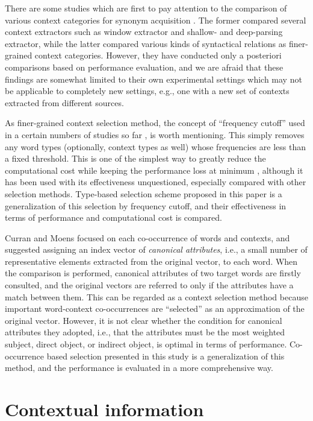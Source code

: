 \documentclass[english]{jnlp_1.4}
\begin{document}
There are some studies which are first to pay attention to the
comparison of various context categories for synonym acquisition
\cite{Curran:02:scaling,Hagiwara:06}. The former compared several
context extractors such as window extractor and shallow- and
deep-parsing extractor, while the latter compared various kinds of
syntactical relations as finer-grained context categories.  However,
they have conducted only a posteriori comparisons based on performance
evaluation, and we are afraid that these findings are somewhat limited
to their own experimental settings which may not be applicable to
completely new settings, e.g., one with a new set of contexts
extracted from different sources.

As finer-grained context selection method, the concept of ``frequency
cutoff'' used in a certain numbers of studies so far
\cite{Curran:02:scaling,Pado:07}, is worth mentioning. This simply
removes any word types (optionally, context types as well) whose
frequencies are less than a fixed threshold. This is one of the
simplest way to greatly reduce the computational cost while keeping
the performance loss at minimum \cite{Curran:02:scaling}, although it
has been used with its effectiveness unquestioned, especially compared
with other selection methods. Type-based selection scheme proposed in
this paper is a generalization of this selection by frequency cutoff,
and their effectiveness in terms of performance and computational cost
is compared.

Curran and Moens \cite{Curran:02:improvements} focused on each
co-occurrence of words and contexts, and suggested assigning an index
vector of {\em canonical attributes}, i.e., a small number of
representative elements extracted from the original vector, to each
word. When the comparison is performed, canonical attributes of two
target words are firstly consulted, and the original vectors are
referred to only if the attributes have a match between them. This can
be regarded as a context selection method because important
word-context co-occurrences are ``selected'' as an approximation of
the original vector. However, it is not clear whether the condition
for canonical attributes they adopted, i.e., that the attributes must
be the most weighted subject, direct object, or indirect object, is
optimal in terms of performance. Co-occurrence based selection
presented in this study is a generalization of this method, and the
performance is evaluated in a more comprehensive way.

\section{Contextual information}
\end{document}
